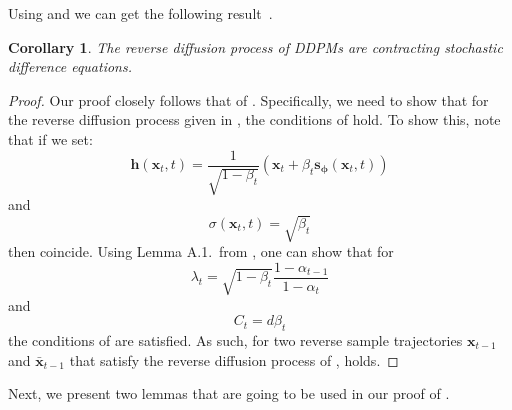 \documentclass[conference]{IEEEtran}
\newtheorem{corollary}{Corollary}[theorem]
\theoremstyle{definition}
\theoremstyle{remark}
\theoremstyle{proposition}
\begin{document}
Using  and  we can get the following result~\citep{chung2022come}.

\begin{corollary}\label{cor:ddpm_contraction}
    The reverse diffusion process of DDPMs are contracting stochastic difference equations.
\end{corollary}
\begin{proof}
    Our proof closely follows that of \citet{chung2022come}.
    Specifically, we need to show that for the reverse diffusion process given in , the conditions of  hold.
    To show this, note that if we set:
    $${\mathbf{h}(\boldsymbol{x}_t, t) = \frac{1}{\sqrt{1-\beta_{t}}}\left(\boldsymbol{x}_{t}+\beta_{t} \mathbf{s}_{\boldsymbol{\phi}}(\boldsymbol{x}_{t}, t)\right)}$$
    and
    $$\sigma(\boldsymbol{x}_t, t) = \sqrt{\beta_{t}}$$
    then  coincide.
    Using Lemma A.1.~from \citet{chung2022come}, one can show that for
    \begin{equation}\label{eq:lambda_t}
        \lambda_{t} = \sqrt{1 - \beta_{t}} \frac{1-\alpha_{t-1}}{1-\alpha_{t}}
    \end{equation}
    and
    \begin{equation}\label{eq:C_t}
        C_{t} = d \beta_{t}
    \end{equation}
    the conditions of  are satisfied.
    As such, for two reverse sample trajectories $\boldsymbol{x}_{t-1}$ and $\bar{\boldsymbol{x}}_{t-1}$ that satisfy the reverse diffusion process of ,  holds. 
\end{proof}
Next, we present two lemmas that are going to be used in our proof of .
\end{document}
